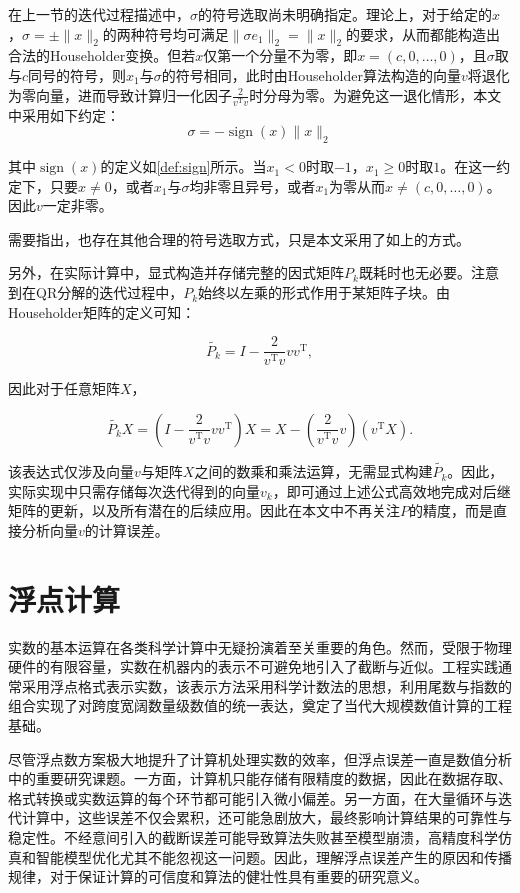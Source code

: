 ﻿\documentclass[UTF8,a4paper,openany]{ctexbook}
\DeclareMathOperator{\sign}{sign}
\theoremstyle{qrplain}
\begin{document}
在上一节的迭代过程描述中，$\sigma$的符号选取尚未明确指定。理论上，对于给定的$x$，$\sigma=\pm\|x\|_2$的两种符号均可满足$\|\sigma e_1\|_2=\|x\|_2$的要求，从而都能构造出合法的Householder变换。但若$x$仅第一个分量不为零，即$x=(c,0,\ldots,0)$，且$\sigma$取与$c$同号的符号，则$x_1$与$\sigma$的符号相同，此时由Householder算法构造的向量$v$将退化为零向量，进而导致计算归一化因子$\frac{2}{v^\mathrm{T}v}$时分母为零。为避免这一退化情形，本文中采用如下约定：
$$\sigma = -\sign (x)\|x\|_2$$

其中$\sign(x)$的定义如\ref{def:sign}所示。当$x_1<0$时取$-1$，$x_1\ge 0$时取$1$。在这一约定下，只要$x\neq 0$，或者$x_1$与$\sigma$均非零且异号，或者$x_1$为零从而$x\neq(c,0,\ldots,0)$。因此$v$一定非零。

需要指出，也存在其他合理的符号选取方式，只是本文采用了如上的方式。

另外，在实际计算中，显式构造并存储完整的因式矩阵$P_k$既耗时也无必要。注意到在QR分解的迭代过程中，$P_k$始终以左乘的形式作用于某矩阵子块。由Householder矩阵的定义可知：

$$
\widetilde{P_k} = I - \frac{2}{v^\mathrm{T}v}vv^\mathrm{T},
$$

因此对于任意矩阵$X$，

$$
\widetilde{P_k}X = \left(I - \frac{2}{v^\mathrm{T}v}vv^\mathrm{T}\right)X = X - \left(\frac{2}{v^\mathrm{T}v}v\right)(v^\mathrm{T}X).
$$

该表达式仅涉及向量$v$与矩阵$X$之间的数乘和乘法运算，无需显式构建$\widetilde{P_k}$。因此，实际实现中只需存储每次迭代得到的向量$v_k$，即可通过上述公式高效地完成对后继矩阵的更新，以及所有潜在的后续应用。因此在本文中不再关注$P$的精度，而是直接分析向量$v$的计算误差。

\section{浮点计算}

实数的基本运算在各类科学计算中无疑扮演着至关重要的角色。然而，受限于物理硬件的有限容量，实数在机器内的表示不可避免地引入了截断与近似。工程实践通常采用浮点格式表示实数，该表示方法采用科学计数法的思想，利用尾数与指数的组合实现了对跨度宽阔数量级数值的统一表达，奠定了当代大规模数值计算的工程基础。

尽管浮点数方案极大地提升了计算机处理实数的效率，但浮点误差一直是数值分析中的重要研究课题。一方面，计算机只能存储有限精度的数据，因此在数据存取、格式转换或实数运算的每个环节都可能引入微小偏差。另一方面，在大量循环与迭代计算中，这些误差不仅会累积，还可能急剧放大，最终影响计算结果的可靠性与稳定性。不经意间引入的截断误差可能导致算法失败甚至模型崩溃，高精度科学仿真和智能模型优化尤其不能忽视这一问题。因此，理解浮点误差产生的原因和传播规律，对于保证计算的可信度和算法的健壮性具有重要的研究意义。
\end{document}
